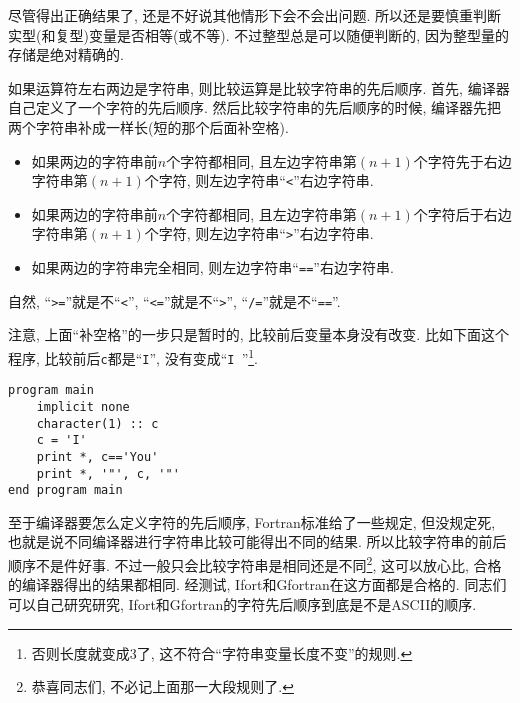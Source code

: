 尽管得出正确结果了, 还是不好说其他情形下会不会出问题. 所以还是要慎重判断实型(和复型)变量是否相等(或不等). 不过整型总是可以随便判断的, 因为整型量的存储是绝对精确的.

如果运算符左右两边是字符串, 则比较运算是比较字符串的先后顺序. 首先, 编译器自己定义了一个字符的先后顺序. 然后比较字符串的先后顺序的时候, 编译器先把两个字符串补成一样长(短的那个后面补空格).
\begin{itemize}
    \item 如果两边的字符串前$n$个字符都相同, 且左边字符串第$(n+1)$个字符先于右边字符串第$(n+1)$个字符, 则左边字符串``\texttt{<}''右边字符串.
    \item 如果两边的字符串前$n$个字符都相同, 且左边字符串第$(n+1)$个字符后于右边字符串第$(n+1)$个字符, 则左边字符串``\texttt{>}''右边字符串.
    \item 如果两边的字符串完全相同, 则左边字符串``\texttt{==}''右边字符串.
\end{itemize}
自然, ``\texttt{>=}''就是不``\texttt{<}'', ``\texttt{<=}''就是不``\texttt{>}'', ``\texttt{/=}''就是不``\texttt{==}''.

注意, 上面``补空格''的一步只是暂时的, 比较前后变量本身没有改变. 比如下面这个程序, 比较前后\texttt{c}都是``\texttt{I}'', 没有变成``\texttt{I  }''\footnote{
否则长度就变成3了, 这不符合``字符串变量长度不变''的规则.
}.
\begin{lstlisting}
program main
    implicit none
    character(1) :: c
    c = 'I'
    print *, c=='You'
    print *, '"', c, '"'
end program main
\end{lstlisting}

至于编译器要怎么定义字符的先后顺序, Fortran标准给了一些规定, 但没规定死, 也就是说不同编译器进行字符串比较可能得出不同的结果. 所以比较字符串的前后顺序不是件好事. 不过一般只会比较字符串是相同还是不同\footnote{
    恭喜同志们, 不必记上面那一大段规则了.
}, 这可以放心比, 合格的编译器得出的结果都相同. 经测试, Ifort和Gfortran在这方面都是合格的. 同志们可以自己研究研究, Ifort和Gfortran的字符先后顺序到底是不是ASCII的顺序.
